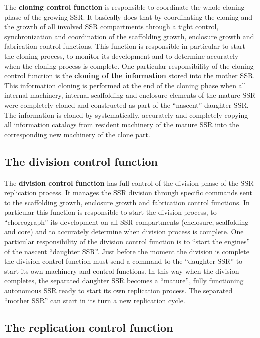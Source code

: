 \hypertarget{RefHeading3100306210128}{}The \textbf{cloning control
function} is responsible to coordinate the whole cloning phase of the
growing SSR. It basically does that by coordinating the cloning and the
growth of all involved SSR compartments through a tight control,
synchronization and coordination of the scaffolding growth, enclosure
growth and fabrication control functions. This function is responsible
in particular to start the cloning process, to monitor its development
and to determine accurately when the cloning process is complete. One
particular responsibility of the cloning control function is the
\textbf{cloning of the information} stored into the mother SSR. This
information cloning is performed at the end of the cloning phase when
all internal machinery, internal scaffolding and enclosure elements of
the mature SSR were completely cloned and constructed as part of the
“nascent” daughter SSR. The information is cloned by systematically,
accurately and completely copying all information catalogs from
resident machinery of the mature SSR into the corresponding new
machinery of the clone part.

\subsection[The division control function]{The division control
function}

\hypertarget{RefHeading3102306210128}{}The \textbf{division control
function} has full control of the division phase of the SSR replication
process. It manages the SSR division through specific commands sent to
the scaffolding growth, enclosure growth and fabrication control
functions.  In particular this function is responsible to start the
division process, to “choreograph” its development on all SSR
compartments (enclosure, scaffolding and core) and to accurately
determine when division process is complete. One particular
responsibility of the division control function is to “start the
engines” of the nascent “daughter SSR”. Just before the moment the
division is complete the division control function must send a command
to the “daughter SSR” to start its own machinery and control functions.
In this way when the division completes, the separated daughter SSR
becomes a “mature”, fully functioning autonomous SSR ready to start its
own replication process. The separated “mother SSR” can start in its
turn a new replication cycle.

\subsection[The replication control function]{The replication control
function}

